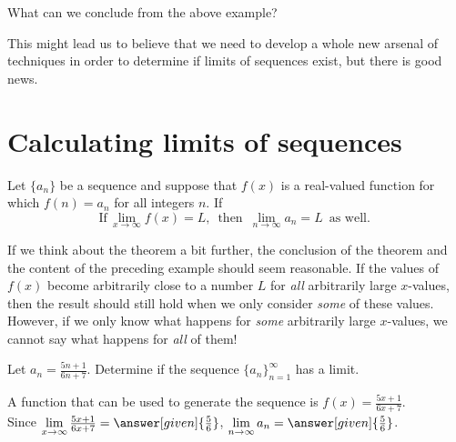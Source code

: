 \documentclass{ximera}
\begin{document}
What can we conclude from the above example?

\begin{multipleChoice}
\end{multipleChoice}

This might lead us to believe that we need to develop a whole new arsenal of techniques in order to determine if limits of sequences exist, but there is good news.










\section*{Calculating limits of sequences}

\begin{theorem}
  Let $\{a_n\}$ be a sequence and suppose that $f(x)$ is a real-valued function for which $f(n) = a_n$ for all integers $n$.  If
  \[
  \text{If} \, \lim\limits_{x\to\infty}f(x)=L, \, \text{ then } \, \lim\limits_{n\to\infty} a_n=L \, \text{ as well. }
  \]
 
\end{theorem}

If we think about the theorem a bit further, the conclusion  of the theorem and the content of the preceding example should seem reasonable.  If the values of $f(x)$ become arbitrarily close to a number $L$ for \emph{all} arbitrarily large $x$-values, then the result should still hold when we only consider \emph{some} of these values.  However, if we only know what happens for \emph{some} arbitrarily large $x$-values, we cannot say what happens for \emph{all} of them!










\begin{example}
Let $a_n = \frac{5n+1}{6n+7}$.  Determine if the sequence $\{a_n\}_{n=1}^{\infty}$ has a limit.

\begin{explanation}
A function that can be used to generate the sequence is $f(x) = \frac{5x+1}{6x+7}$.  \\

Since $\lim\limits_{x \to \infty} \frac{5x+1}{6x+7} = \answer[given]{\frac{5}{6}}$, $\lim\limits_{n \to \infty} a_n = \answer[given]{\frac{5}{6}}$.
\end{explanation}

\end{example}
\end{document}
